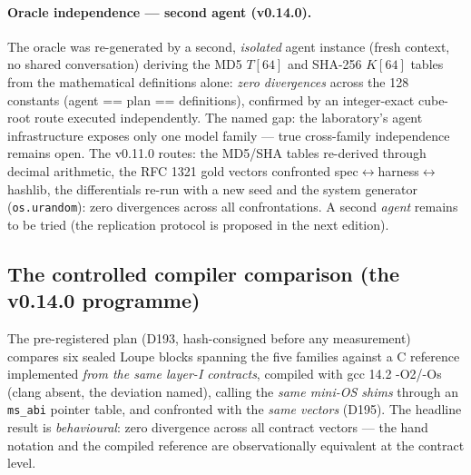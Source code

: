 \documentclass[10pt,a4paper]{article}
\newcommand{\code}[1]{\texttt{\small #1}}
\begin{document}
\paragraph{Oracle independence --- second agent (v0.14.0).} The oracle was
re-generated by a second, \emph{isolated} agent instance (fresh context,
no shared conversation) deriving the MD5 $T[64]$ and SHA-256 $K[64]$
tables from the mathematical definitions alone: \emph{zero divergences}
across the 128 constants (agent == plan == definitions), confirmed by an
integer-exact cube-root route executed independently. The named gap:
the laboratory's agent infrastructure exposes only one model family ---
true cross-family independence remains open. The v0.11.0 routes: the
MD5/SHA tables re-derived
through decimal arithmetic, the RFC 1321 gold vectors confronted
spec$\leftrightarrow$\allowbreak harness$\leftrightarrow$\allowbreak hashlib, the differentials
re-run with a new seed and the system generator (\code{os.urandom}):
zero divergences across all confrontations. A second \emph{agent} remains
to be tried (the replication protocol is proposed in the next edition).

\subsection{The controlled compiler comparison (the v0.14.0 programme)}\label{sec:comparaison}

The pre-registered plan (D193, hash-consigned before any measurement)
compares six sealed Loupe blocks spanning the five families against a C
reference implemented \emph{from the same layer-I contracts}, compiled
with gcc 14.2 -O2/-Os (clang absent, the deviation named), calling the
\emph{same mini-OS shims} through an \code{ms\_abi} pointer table, and
confronted with the \emph{same vectors} (D195). The headline result is
\emph{behavioural}: zero divergence across all contract vectors ---
the hand notation and the compiled reference are observationally
equivalent at the contract level.
\end{document}
